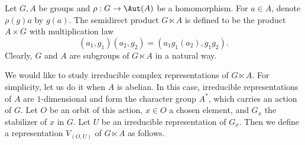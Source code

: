 
Let $G,A$ be groups and $\rho:G\to\Aut(A)$ be a homomorphism. For $a\in A$, denote $\rho(g)a$ by $g(a)$. The semidirect product $G\ltimes A$ is defined to be the product $A\times G$ with multiplication law
\[
(a_1,g_1)(a_2,g_2)=(a_1g_1(a_2),g_1g_2).
\]
Clearly, $G$ and $A$ are subgroups of $G\ltimes A$ in a natural way.

We would like to study irreducible complex representations of $G\ltimes A$. For simplicity, let us do it when $A$ is abelian. In this case, irreducible representations of $A$ are $1$-dimensional and form the character group $A^*$, which carries an action of $G$. Let $O$ be an orbit of this action, $x\in O$ a chosen element, and $G_x$ the stabilizer of $x$ in $G$. Let $U$ be an irreducible representation of $G_x$. Then we define a representation $V_{(O,U)}$ of $G\ltimes A$ as follows.

